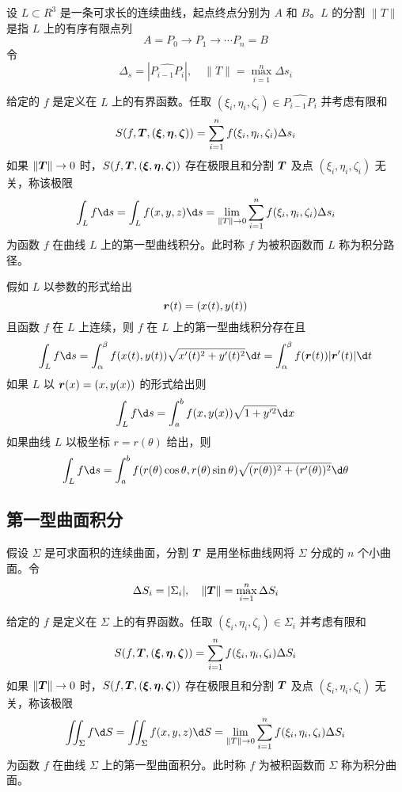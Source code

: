设 $L \subset R^3$ 是一条可求长的连续曲线，起点终点分别为 $A$ 和 $B$。$L$ 的分割 $\|T\|$ 是指 $L$ 上的有序有限点列
\[ A = P_0 \to P_1 \to \cdots P_n = B \]
令
\[ \Delta_s = \left| \widehat{P_{i-1}P_i} \right|, \quad \|T\| = \max_{i=1}^n \Delta s_i \]

\begin{definition}
	给定的 $f$ 是定义在 $L$ 上的有界函数。任取 $(\xi_i, \eta_i, \zeta_i) \in \widehat{P_{i-1} P_i}$ 并考虑有限和
	\[ S(f, \boldsymbol{T}, (\boldsymbol{\xi}, \boldsymbol{\eta}, \boldsymbol{\zeta})) = \sum_{i=1}^{n} f(\xi_i, \eta_i, \zeta_i)\Delta s_i \]
	如果 $\|\boldsymbol{T}\| \to 0$ 时，$S(f, \boldsymbol{T}, (\boldsymbol{\xi}, \boldsymbol{\eta}, \boldsymbol{\zeta}))$ 存在极限且和分割 $\boldsymbol{T}$ 及点 $(\xi_i, \eta_i, \zeta_i)$ 无关，称该极限
	\[ \int_L f \d s = \int_{L} f(x, y, z) \d s = \lim_{\|T\| \to 0} \sum_{i=1}^{n} f(\xi_i, \eta_i, \zeta_i) \Delta s_i \]
	为函数 $f$ 在曲线 $L$ 上的第一型曲线积分。此时称 $f$ 为被积函数而 $L$ 称为积分路径。
\end{definition}

假如 $L$ 以参数的形式给出
\[ \boldsymbol{r}(t) = (x(t), y(t)) \]
且函数 $f$ 在 $L$ 上连续，则 $f$ 在 $L$ 上的第一型曲线积分存在且
\[ \int_L f \d s = \int_{\alpha}^{\beta}f(x(t), y(t)) \sqrt{x'(t)^2 + y'(t)^2} \d t = \int_{\alpha}^\beta f(\vbf{r}(t))|\vbf{r}'(t)| \d t \]
如果 $L$ 以 $\boldsymbol{r}(x) = (x, y(x))$ 的形式给出则
\[ \int_L f \d s = \int_{a}^{b} f(x, y(x)) \sqrt{1 + y'^2} \d x \]
如果曲线 $L$ 以极坐标 $r = r(\theta)$ 给出，则
\[ \int_L f \d s = \int_{a}^{b} f(r(\theta) \cos \theta, r(\theta) \sin \theta) \sqrt{(r(\theta))^2 + (r'(\theta))^2} \d \theta \]

\subsection{第一型曲面积分}

假设 $\Sigma$ 是可求面积的连续曲面，分割 $\boldsymbol{T}$ 是用坐标曲线网将 $\Sigma$ 分成的 $n$ 个小曲面。令
\[ \Delta S_i = |\Sigma_i|, \quad \|\boldsymbol{T}\| = \max_{i=1}^n \Delta S_i \]

\begin{definition}
	给定的 $f$ 是定义在 $\Sigma$ 上的有界函数。任取 $(\xi_i, \eta_i, \zeta_i) \in \Sigma_i$ 并考虑有限和
	\[ S(f, \boldsymbol{T}, (\boldsymbol{\xi}, \boldsymbol{\eta}, \boldsymbol{\zeta})) = \sum_{i=1}^{n} f(\xi_i, \eta_i, \zeta_i)\Delta S_i \]
	如果 $\|\boldsymbol{T}\| \to 0$ 时，$S(f, \boldsymbol{T}, (\boldsymbol{\xi}, \boldsymbol{\eta}, \boldsymbol{\zeta}))$ 存在极限且和分割 $\boldsymbol{T}$ 及点 $(\xi_i, \eta_i, \zeta_i)$ 无关，称该极限
	\[ \iint_\Sigma f \d S = \iint_{\Sigma} f(x, y, z) \d S = \lim_{\|T\| \to 0} \sum_{i=1}^{n} f(\xi_i, \eta_i, \zeta_i) \Delta S_i \]
	为函数 $f$ 在曲线 $\Sigma$ 上的第一型曲面积分。此时称 $f$ 为被积函数而 $\Sigma$ 称为积分曲面。
\end{definition}

